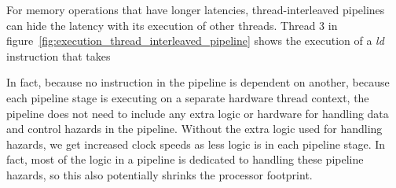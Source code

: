 For memory operations that have longer latencies, thread-interleaved pipelines can hide the latency with its execution of other threads. 
Thread 3 in figure~\ref{fig:execution_thread_interleaved_pipeline} shows the execution of a \emph{ld} instruction that takes 


In fact, because no instruction in the pipeline is dependent on another, because each pipeline stage is executing on a separate hardware thread context, the pipeline does not need to include any extra logic or hardware for handling data and control hazards in the pipeline. 
Without the extra logic used for handling hazards, we get increased clock speeds as less logic is in each pipeline stage.
In fact, most of the logic in a pipeline is dedicated to handling these pipeline hazards, so this also potentially shrinks the processor footprint.



